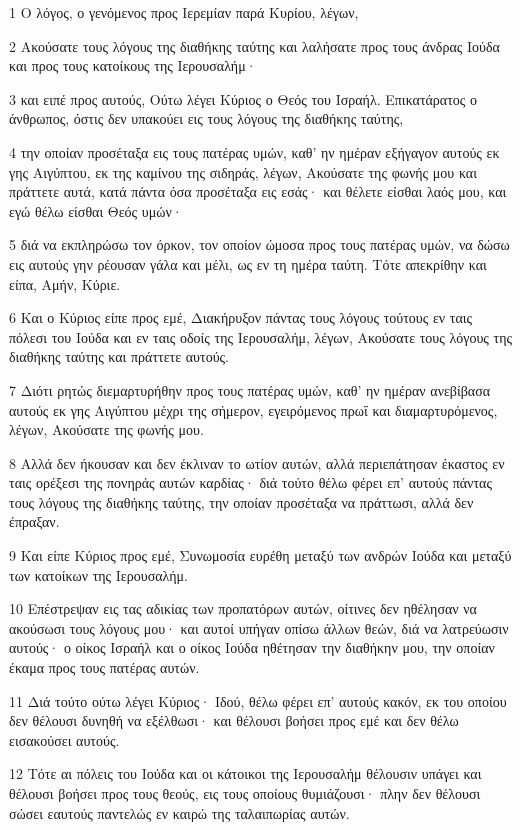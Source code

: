 \par 1 Ο λόγος, ο γενόμενος προς Ιερεμίαν παρά Κυρίου, λέγων,
\par 2 Ακούσατε τους λόγους της διαθήκης ταύτης και λαλήσατε προς τους άνδρας Ιούδα και προς τους κατοίκους της Ιερουσαλήμ·
\par 3 και ειπέ προς αυτούς, Ούτω λέγει Κύριος ο Θεός του Ισραήλ. Επικατάρατος ο άνθρωπος, όστις δεν υπακούει εις τους λόγους της διαθήκης ταύτης,
\par 4 την οποίαν προσέταξα εις τους πατέρας υμών, καθ' ην ημέραν εξήγαγον αυτούς εκ γης Αιγύπτου, εκ της καμίνου της σιδηράς, λέγων, Ακούσατε της φωνής μου και πράττετε αυτά, κατά πάντα όσα προσέταξα εις εσάς· και θέλετε είσθαι λαός μου, και εγώ θέλω είσθαι Θεός υμών·
\par 5 διά να εκπληρώσω τον όρκον, τον οποίον ώμοσα προς τους πατέρας υμών, να δώσω εις αυτούς γην ρέουσαν γάλα και μέλι, ως εν τη ημέρα ταύτη. Τότε απεκρίθην και είπα, Αμήν, Κύριε.
\par 6 Και ο Κύριος είπε προς εμέ, Διακήρυξον πάντας τους λόγους τούτους εν ταις πόλεσι του Ιούδα και εν ταις οδοίς της Ιερουσαλήμ, λέγων, Ακούσατε τους λόγους της διαθήκης ταύτης και πράττετε αυτούς.
\par 7 Διότι ρητώς διεμαρτυρήθην προς τους πατέρας υμών, καθ' ην ημέραν ανεβίβασα αυτούς εκ γης Αιγύπτου μέχρι της σήμερον, εγειρόμενος πρωΐ και διαμαρτυρόμενος, λέγων, Ακούσατε της φωνής μου.
\par 8 Αλλά δεν ήκουσαν και δεν έκλιναν το ωτίον αυτών, αλλά περιεπάτησαν έκαστος εν ταις ορέξεσι της πονηράς αυτών καρδίας· διά τούτο θέλω φέρει επ' αυτούς πάντας τους λόγους της διαθήκης ταύτης, την οποίαν προσέταξα να πράττωσι, αλλά δεν έπραξαν.
\par 9 Και είπε Κύριος προς εμέ, Συνωμοσία ευρέθη μεταξύ των ανδρών Ιούδα και μεταξύ των κατοίκων της Ιερουσαλήμ.
\par 10 Επέστρεψαν εις τας αδικίας των προπατόρων αυτών, οίτινες δεν ηθέλησαν να ακούσωσι τους λόγους μου· και αυτοί υπήγαν οπίσω άλλων θεών, διά να λατρεύωσιν αυτούς· ο οίκος Ισραήλ και ο οίκος Ιούδα ηθέτησαν την διαθήκην μου, την οποίαν έκαμα προς τους πατέρας αυτών.
\par 11 Διά τούτο ούτω λέγει Κύριος· Ιδού, θέλω φέρει επ' αυτούς κακόν, εκ του οποίου δεν θέλουσι δυνηθή να εξέλθωσι· και θέλουσι βοήσει προς εμέ και δεν θέλω εισακούσει αυτούς.
\par 12 Τότε αι πόλεις του Ιούδα και οι κάτοικοι της Ιερουσαλήμ θέλουσιν υπάγει και θέλουσι βοήσει προς τους θεούς, εις τους οποίους θυμιάζουσι· πλην δεν θέλουσι σώσει εαυτούς παντελώς εν καιρώ της ταλαιπωρίας αυτών.
